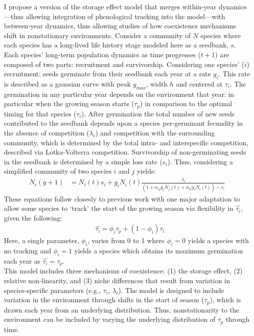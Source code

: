 \documentclass[12pt,a4paper,oneside]{article}
\begin{document}
I propose a version of the storage effect model that merges within-year dynamics---thus allowing integration of phenological tracking into the model---with between-year dynamics, thus allowing studies of how coexistence mechanisms shift in nonstationary environments. Consider a community of $N$ species where each species has a long-lived life history stage modeled here as a seedbank, $s$. Each species' long-term population dynamics as time progresses ($t+1$) are composed of two parts: recruitment and survivorship. Considering one species' ($i$) recruitment: seeds germinate from their seedbank each year at a rate $g_{i}$. This rate is described as a gaussian curve with peak $g_{max}$, width $h$ and centered at $\tau_{i}$.  The germination in any particular year depends on the environment that year: in particular when the growing season starts ($\tau_p$) in comparison to the optimal timing for that species ($\tau_i$). After germination the total number of new seeds contributed to the seedbank depends upon a species per-germinant fecundity in the absence of competition ($\lambda_i$) and competition with the surrounding community, which is determined by the total intra- and interspecific competition, described via Lotka-Volterra competition. Survivorship of non-germinating seeds in the seedbank is determined by a simple loss rate ($s_i$). Thus, considering a simplified community of two species $i$ and $j$ yields:
\begin{align}
 N_i(y+1) & = N_i(t)s_i + g_iN_i(t)\frac{\lambda_i}{(1+\alpha_{ij}g_jN_j(t)+\alpha_{ii}g_iN_i(t)) - s_i}
\end{align}
These equations follow closesly to previous work \citep{CHESSON:1994vn,Chesson:2004eo} with one major adaptation to allow some species to `track' the start of the growing season via flexibility in $\hat{\tau_i}$, given the following:
\begin{align}
&\hat{\tau_{i}} = \phi_i \tau_{p} + (1-\phi_i)\tau_{i}
\end{align}
Here, a single parameter, $\phi_i$, varies from 0 to 1 where $\phi_i=0$ yields a species with no tracking and $\phi_i=1$ yields a species which obtains its maximum germination each year as $\hat{\tau_i}=\tau_p$.
\vspace{1.5ex}\\
This model includes three mechanisms of coexistence: (1) the storage effect, (2) relative non-linearity, and (3) niche differences that result from variation in species-specific parameters (e.g., $\tau_i$, $\lambda_i$). The model is designed to include variation in the environment through shifts in the start of season ($\tau_p$), which is drawn each year from an underlying distribution. Thus, nonstationarity to the environment can be included by varying the underlying distribution of $\tau_p$ through time. 
\end{document}
